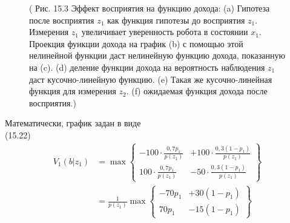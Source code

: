 \documentclass[10pt,a4paper]{article}
\begin{document}
\begin{figure}[H]
	\caption{ ( Рис. 15.3 Эффект восприятия на функцию дохода: (a) Гипотеза после восприятия  $z_1$ как функция гипотезы до восприятия $z_1$. Измерения $z_1$ увеличивает уверенность робота в состоянии $x_1$. Проекция функции дохода на график (b) с помощью этой нелинейной функции даст нелинейную функцию дохода, показанную на (c). (d) деление функции дохода на вероятность наблюдения $z_1$ даст кусочно-линейную функцию. (e) Такая же кусочно-линейная функция для измерения $z_2$. (f) ожидаемая функция дохода после восприятия.) }
	\label{fig:153orig}
\end{figure}

Математически, график задан в виде\\

(15.22)
\begin{equation*}
\begin{split}
V_1(b|z_1)&=\max\left\{
\begin{array}{rr}
-100\cdot\frac{0,7p_1}{p(z_1)}&+100\cdot\frac{0,3(1-p_1)}{p(z_1)}\\
100\cdot\frac{0,7p_1}{p(z_1)}&-50\cdot\frac{0,3(1-p_1)}{p(z_1)} 
\end{array}
\right\}\\
&=\frac{1}{p(z_1)}\max\left\{
\begin{array}{rr}
-70p_1&+30(1-p_1)\\
70p_1&-15(1-p_1)
\end{array}\right\}
\end{split}
\end{equation*}
\end{document}
